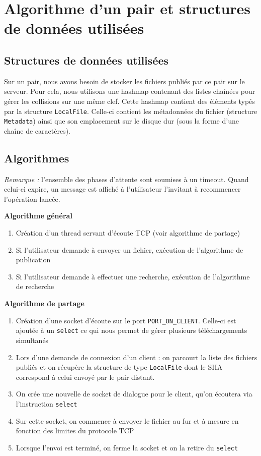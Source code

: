 \section{Algorithme d'un pair et structures de données utilisées}

\subsection{Structures de données utilisées}

Sur un pair, nous avons besoin de stocker les fichiers publiés par ce pair sur le serveur. Pour cela, nous utilisons une hashmap contenant des listes chaînées pour gérer 
les collisions sur une même clef. Cette hashmap contient des éléments typés par la structure \texttt{LocalFile}. Celle-ci contient les métadonnées du fichier (structure
\texttt{Metadata}) ainsi que son emplacement sur le disque dur (sous la forme d'une chaîne de caractères).

\subsection{Algorithmes}

\noindent \textit{Remarque :} l'ensemble des phases d'attente sont soumises à un timeout. Quand celui-ci expire, un message est affiché à l'utilisateur l'invitant à recommencer l'opération lancée.

\noindent \textbf{Algorithme général}

\begin{enumerate}
	\item Création d'un thread servant d'écoute TCP (voir algorithme de partage)
	\item Si l'utilisateur demande à envoyer un fichier, exécution de l'algorithme de publication
	\item Si l'utilisateur demande à effectuer une recherche, exécution de l'algorithme de recherche
\end{enumerate}

\noindent \textbf{Algorithme de partage}

\begin{enumerate}
	\item Création d'une socket d'écoute sur le port \texttt{PORT\_ON\_CLIENT}. Celle-ci est ajoutée à un \texttt{select} ce qui nous permet de gérer plusieurs téléchargements simultanés
	\item Lors d'une demande de connexion d'un client : on parcourt la liste des fichiers publiés et on récupère la structure de type \texttt{LocalFile} dont le SHA correspond 
	à celui envoyé par le pair distant.
	\item On crée une nouvelle de socket de dialogue pour le client, qu'on écoutera via l'instruction \texttt{select}
	\item Sur cette socket, on commence à envoyer le fichier au fur et à mesure en fonction des limites du protocole TCP
	\item Lorsque l'envoi est terminé, on ferme la socket et on la retire du \texttt{select}
\end{enumerate}

